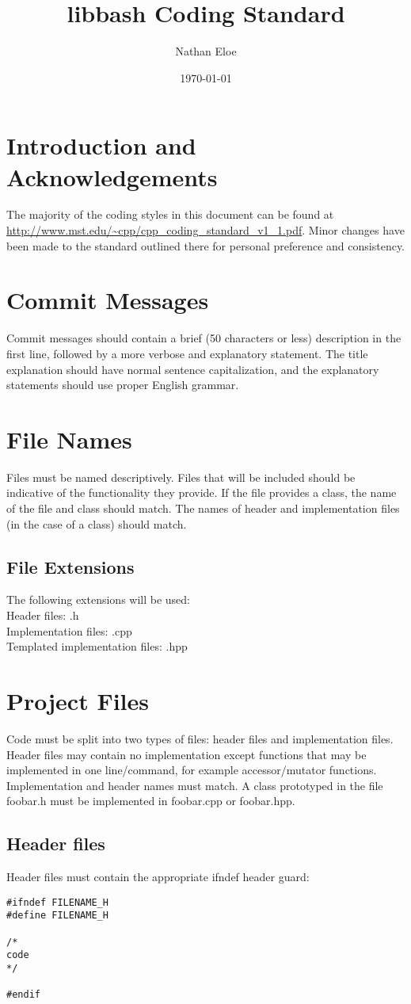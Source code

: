 \documentclass[letterpaper,10pt]{article}
\title{libbash Coding Standard}
\author{Nathan Eloe}
\date{\today}
\begin{document}
\maketitle
\section{Introduction and Acknowledgements}
The majority of the coding styles in this document can be found at \url{http://www.mst.edu/~cpp/cpp_coding_standard_v1_1.pdf}.  Minor changes have been made to the standard outlined there for personal preference and consistency.
\section{Commit Messages}
Commit messages should contain a brief (50 characters or less) description in the first line, followed by a more verbose and explanatory statement.  The title explanation should have normal sentence capitalization, and the explanatory statements should use proper English grammar.
\section{File Names}
Files must be named descriptively.  Files that will be included should be indicative of the functionality they provide.  If the file provides a class, the name of the file and class should match.  The names of header and implementation files (in the case of a class) should match.
\subsection{File Extensions}
The following extensions will be used:\\
Header files: .h\\
Implementation files: .cpp\\
Templated implementation files: .hpp
\section{Project Files}
Code must be split into two types of files: header files and implementation files.  Header files may contain no implementation except functions that may be implemented in one line/command, for example accessor/mutator functions.\\
Implementation and header names must match.  A class prototyped in the file foobar.h must be implemented in foobar.cpp or foobar.hpp.\\
\subsection{Header files}
Header files must contain the appropriate ifndef header guard:
\begin{verbatim}
#ifndef FILENAME_H
#define FILENAME_H

/* 
code
*/

#endif
\end{verbatim}
\end{document}
